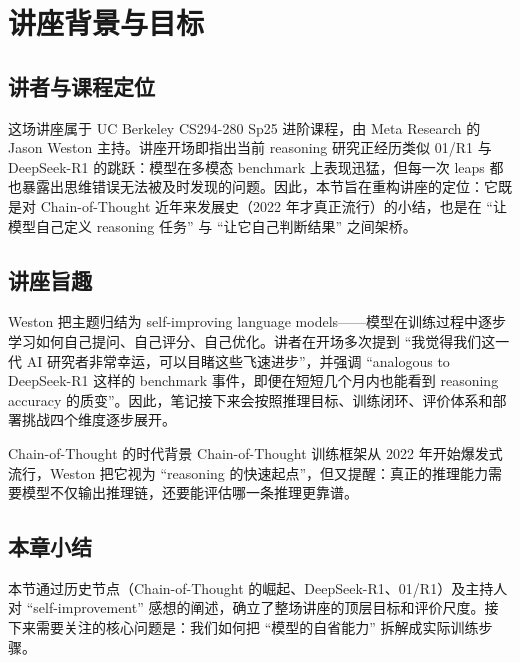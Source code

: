 \section{讲座背景与目标}
\subsection{讲者与课程定位}
这场讲座属于 UC Berkeley CS294-280 Sp25 进阶课程，由 Meta Research 的 Jason Weston 主持。讲座开场即指出当前 reasoning 研究正经历类似 01/R1 与 DeepSeek-R1 的跳跃：模型在多模态 benchmark 上表现迅猛，但每一次 leaps 都也暴露出思维错误无法被及时发现的问题。因此，本节旨在重构讲座的定位：它既是对 Chain-of-Thought 近年来发展史（2022 年才真正流行）的小结，也是在 ``让模型自己定义 reasoning 任务'' 与 ``让它自己判断结果'' 之间架桥。

\subsection{讲座旨趣}
Weston 把主题归结为 self-improving language models——模型在训练过程中逐步学习如何自己提问、自己评分、自己优化。讲者在开场多次提到 ``我觉得我们这一代 AI 研究者非常幸运，可以目睹这些飞速进步''，并强调 ``analogous to DeepSeek-R1 这样的 benchmark 事件，即便在短短几个月内也能看到 reasoning accuracy 的质变''。因此，笔记接下来会按照推理目标、训练闭环、评价体系和部署挑战四个维度逐步展开。

\begin{knowledgebox}{Chain-of-Thought 的时代背景}
Chain-of-Thought 训练框架从 2022 年开始爆发式流行，Weston 把它视为 ``reasoning 的快速起点''，但又提醒：真正的推理能力需要模型不仅输出推理链，还要能评估哪一条推理更靠谱。
\end{knowledgebox}

\subsection{本章小结}
本节通过历史节点（Chain-of-Thought 的崛起、DeepSeek-R1、01/R1）及主持人对 ``self-improvement'' 感想的阐述，确立了整场讲座的顶层目标和评价尺度。接下来需要关注的核心问题是：我们如何把 ``模型的自省能力'' 拆解成实际训练步骤。

